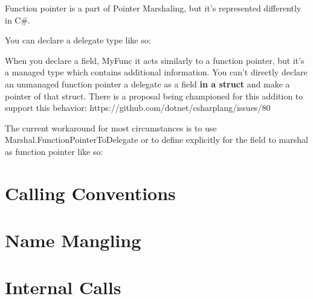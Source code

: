Function pointer is a part of Pointer Marshaling, but it's represented differently in C\#.

You can declare a delegate type like so:



When you declare a field, MyFunc  it acts similarly to a function pointer, but it's a managed type which contains additional information. You can't directly declare an unmanaged function pointer a delegate  as a field \textbf{in a struct} and make a pointer of that struct. There is a proposal being championed for this addition to support this behavior: https://github.com/dotnet/csharplang/issues/80

The current workaround for most circumstances is to use Marshal.FunctionPointerToDelegate or to define explicitly for the field to marshal as function pointer like so:



\section{Calling Conventions}
\section{Name Mangling}
\section{Internal Calls}